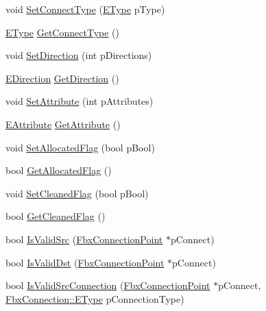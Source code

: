 \begin{DoxyCompactItemize}
\item 
void \hyperlink{class_fbx_connection_point_a9cfa16bd93ff0f631ccd8d6de77b05c3}{Set\+Connect\+Type} (\hyperlink{class_fbx_connection_point_a152767d2d289717698ab68d808f979b5}{E\+Type} p\+Type)
\item 
\hyperlink{class_fbx_connection_point_a152767d2d289717698ab68d808f979b5}{E\+Type} \hyperlink{class_fbx_connection_point_a16e84c648b97cdb86c5615c2a9a50c68}{Get\+Connect\+Type} ()
\item 
void \hyperlink{class_fbx_connection_point_a9cf7e52c6dfab9bb7a3d9242635a42c9}{Set\+Direction} (int p\+Directions)
\item 
\hyperlink{class_fbx_connection_point_a39937aa7b1e2137db6384c1e5756dfff}{E\+Direction} \hyperlink{class_fbx_connection_point_a542ebd55ef536a8dbad04ff8c097e007}{Get\+Direction} ()
\item 
void \hyperlink{class_fbx_connection_point_a06b3412adfa8dc6ef96fa65214f6f843}{Set\+Attribute} (int p\+Attributes)
\item 
\hyperlink{class_fbx_connection_point_a599eb600e5927fb0e7aaea2ee0b999a3}{E\+Attribute} \hyperlink{class_fbx_connection_point_aff1e26fd64fbb4e46cea583678a9ba5c}{Get\+Attribute} ()
\item 
void \hyperlink{class_fbx_connection_point_ac026ad6f5ce4a258fe83007e17b0860e}{Set\+Allocated\+Flag} (bool p\+Bool)
\item 
bool \hyperlink{class_fbx_connection_point_a8c13e1874629e6c535e0051dba26b256}{Get\+Allocated\+Flag} ()
\item 
void \hyperlink{class_fbx_connection_point_a0d2010007894dd64e5399b4f473740a7}{Set\+Cleaned\+Flag} (bool p\+Bool)
\item 
bool \hyperlink{class_fbx_connection_point_a0413ccec6fb43355582468dfd6b195b9}{Get\+Cleaned\+Flag} ()
\item 
bool \hyperlink{class_fbx_connection_point_aed1556396073c8704ea98a6012ae1207}{Is\+Valid\+Src} (\hyperlink{class_fbx_connection_point}{Fbx\+Connection\+Point} $\ast$p\+Connect)
\item 
bool \hyperlink{class_fbx_connection_point_af2fc3a91ca6a8afd4c51ff40bf505ba6}{Is\+Valid\+Dst} (\hyperlink{class_fbx_connection_point}{Fbx\+Connection\+Point} $\ast$p\+Connect)
\item 
bool \hyperlink{class_fbx_connection_point_a8a1d3ca37e0bd5aba348746142689127}{Is\+Valid\+Src\+Connection} (\hyperlink{class_fbx_connection_point}{Fbx\+Connection\+Point} $\ast$p\+Connect, \hyperlink{class_fbx_connection_a3df448a5db356652ab99fd2be2553749}{Fbx\+Connection\+::\+E\+Type} p\+Connection\+Type)

\end{DoxyCompactItemize}
